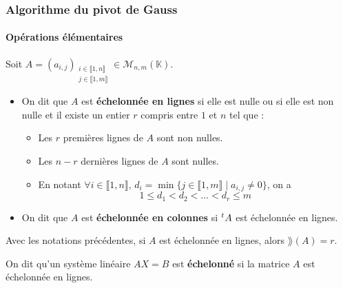   \subsubsection{Algorithme du pivot de Gauss}

  \paragraph{Opérations élémentaires}


  \begin{definition}
    Soit $A = (a_{i,j})_{\substack{i \in \llbracket 1, n \rrbracket \\ j \in \llbracket 1, m \rrbracket}} \in \mathcal{M}_{n,m}(\mathbb{K})$.
    \begin{itemize}
      \item On dit que $A$ est \textbf{échelonnée en lignes} si elle est nulle ou si elle est non nulle et il existe un entier $r$ compris entre $1$ et $n$ tel que :
      \begin{itemize}
        \item Les $r$ premières lignes de $A$ sont non nulles.
        \item Les $n-r$ dernières lignes de $A$ sont nulles.
        \item En notant $\forall i \in \llbracket 1, n \rrbracket, \, d_i = \min\{ j \in \llbracket 1, m \rrbracket \mid a_{i,j} \neq 0 \}$, on a
        \[ 1 \leq d_1 < d_2 < \dots < d_r \leq m \]
      \end{itemize}
      \item On dit que $A$ est \textbf{échelonnée en colonnes} si $\mathstrut ^t A$ est échelonnée en lignes.
    \end{itemize}
  \end{definition}

  \begin{proposition}
    Avec les notations précédentes, si $A$ est échelonnée en lignes, alors $\rang(A) = r$.
  \end{proposition}

  \begin{definition}
    On dit qu'un système linéaire $AX = B$ est \textbf{échelonné} si la matrice $A$ est échelonnée en lignes.
  \end{definition}

